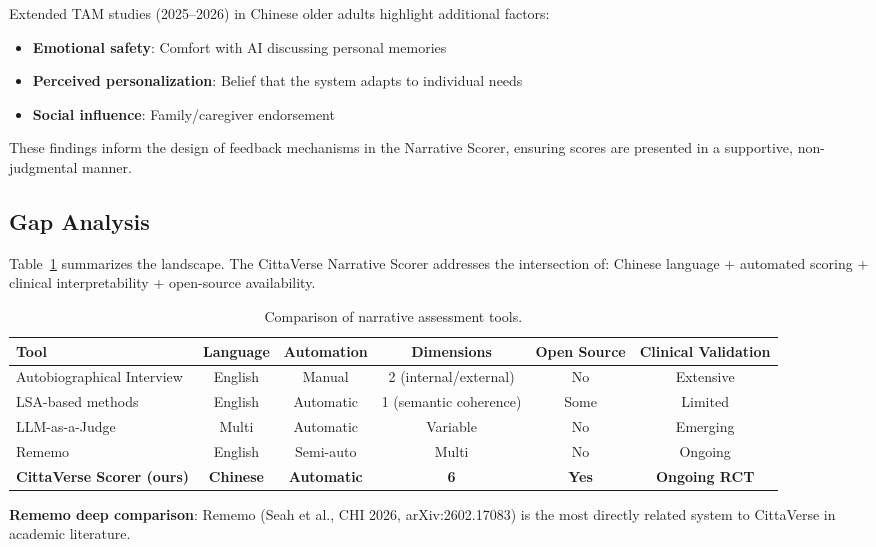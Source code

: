 \documentclass[11pt]{article}
\begin{document}
Extended TAM studies (2025--2026) in Chinese older adults highlight additional factors:
\begin{itemize}
    \item \textbf{Emotional safety}: Comfort with AI discussing personal memories \citep{zhang2025b}
    \item \textbf{Perceived personalization}: Belief that the system adapts to individual needs \citep{liu2025b}
    \item \textbf{Social influence}: Family/caregiver endorsement \citep{chen2026}
\end{itemize}

These findings inform the design of feedback mechanisms in the Narrative Scorer, ensuring scores are presented in a supportive, non-judgmental manner.

\subsection{Gap Analysis}

Table~\ref{tab:gap-analysis} summarizes the landscape. The CittaVerse Narrative Scorer addresses the intersection of: Chinese language + automated scoring + clinical interpretability + open-source availability.

\begin{table}[t]
\centering
\caption{Comparison of narrative assessment tools.}
\label{tab:gap-analysis}
\begin{tabular}{@{}lccccc@{}}
\toprule
\textbf{Tool} & \textbf{Language} & \textbf{Automation} & \textbf{Dimensions} & \textbf{Open Source} & \textbf{Clinical Validation} \\
\midrule
Autobiographical Interview \citep{levine2002} & English & Manual & 2 (internal/external) & No & Extensive \\
LSA-based methods \citep{thomas2025} & English & Automatic & 1 (semantic coherence) & Some & Limited \\
LLM-as-a-Judge \citep{zheng2025} & Multi & Automatic & Variable & No & Emerging \\
Rememo \citep{rememo2026} & English & Semi-auto & Multi & No & Ongoing \\
\textbf{CittaVerse Scorer (ours)} & \textbf{Chinese} & \textbf{Automatic} & \textbf{6} & \textbf{Yes} & \textbf{Ongoing RCT} \\
\bottomrule
\end{tabular}
\end{table}

\textbf{Rememo deep comparison}: Rememo \citep{rememo2026} (Seah et al., CHI 2026, arXiv:2602.17083) is the most directly related system to CittaVerse in academic literature.
\end{document}
